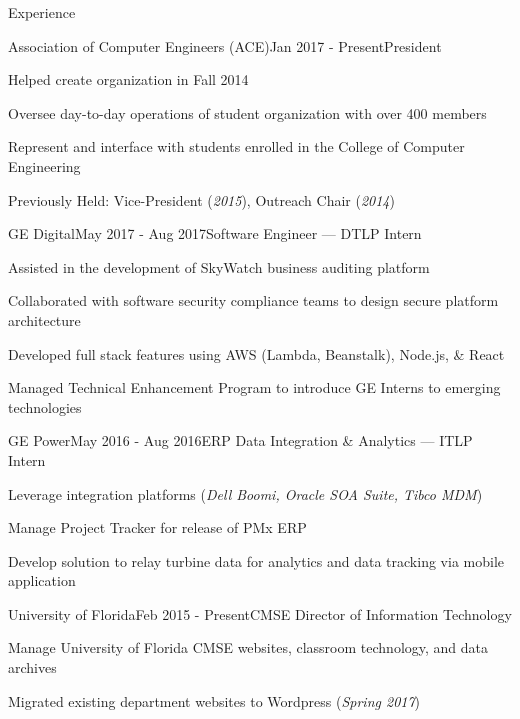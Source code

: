 \documentclass{resume} %
\begin{document}
\begin{rSection}{Experience}

\begin{rSubsection}{Association of Computer Engineers (ACE)}{Jan 2017 - Present}{President}{}
\setlength{\itemindent}{.25in}
\item Helped create organization in Fall 2014
\item Oversee day-to-day operations of student organization with over 400 members
\item Represent and interface with students enrolled in the College of Computer Engineering
\item Previously Held: Vice-President (\textit{2015}), Outreach Chair (\textit{2014})
\end{rSubsection}

\begin{rSubsection}{GE Digital}{May 2017 - Aug 2017}{Software Engineer --- DTLP Intern}{}
\setlength{\itemindent}{.25in}
\item Assisted in the development of SkyWatch business auditing platform
\item Collaborated with software security compliance teams to design secure platform architecture
\item Developed full stack features using AWS (Lambda, Beanstalk), Node.js, \& React
\item Managed Technical Enhancement Program to introduce GE Interns to emerging technologies
\end{rSubsection}

\begin{rSubsection}{GE Power}{May 2016 - Aug 2016}{ERP Data Integration \& Analytics --- ITLP Intern}{}
\setlength{\itemindent}{.25in}
\item Leverage integration platforms (\textit{Dell Boomi, Oracle SOA Suite, Tibco MDM})
\item Manage Project Tracker for release of PMx ERP
\item Develop solution to relay turbine data for analytics and data tracking via mobile application
\end{rSubsection}

\begin{rSubsection}{University of Florida}{Feb 2015 - Present}{CMSE Director of Information Technology}{}
\setlength{\itemindent}{.25in}
\item Manage University of Florida CMSE websites, classroom technology, and data archives
\item Migrated existing department websites to Wordpress (\textit{Spring 2017})
\end{rSubsection}

\end{rSection}
\end{document}

